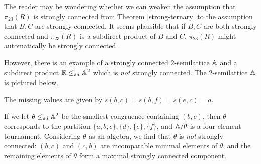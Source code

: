 \documentclass[letterpaper,11pt]{article}
\begin{document}
\begin{ex} The reader may be wondering whether we can weaken the assumption that $\pi_{23}(R)$ is strongly connected from Theorem \ref{strong-ternary} to the assumption that $B,C$ are strongly connected. It seems plausible that if $B,C$ are both strongly connected and $\pi_{23}(R)$ is a subdirect product of $B$ and $C$, $\pi_{23}(R)$ might automatically be strongly connected.

However, there is an example of a strongly connected $2$-semilattice $\mathbb{A}$ and a subdirect product $\mathbb{R} \le_{sd} \mathbb{A}^2$ which is \emph{not} strongly connected. The $2$-semilattice $\mathbb{A}$ is pictured below.
\begin{center}
\end{center}
The missing values are given by $s(b,c) = s(b,f) = s(e,c) = a$.

If we let $\theta \le_{sd} \mathbb{A}^2$ be the smallest congruence containing $(b,c)$, then $\theta$ corresponds to the partition $\{a,b,c\},\{d\},\{e\},\{f\}$, and $\mathbb{A}/\theta$ is a four element tournament. Considering $\theta$ as an algebra, we find that $\theta$ is \emph{not} strongly connected: $(b,c)$ and $(c,b)$ are incomparable minimal elements of $\theta$, and the remaining elements of $\theta$ form a maximal strongly connected component.
\end{ex}
\end{document}
